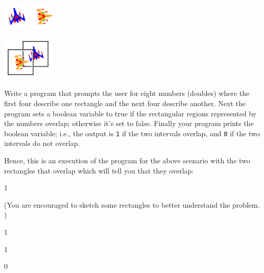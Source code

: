 \begin{center}
\includegraphics[width=0.5in]{figure3.png}
\includegraphics[width=0.5in]{figure4.png}
\end{center}

\begin{center}
\includegraphics[width=1in]{figure5.png}
\end{center}

Write a program that prompts the user for eight numbers (doubles) where the 
first four describe one rectangle and the next four describe another. Next the 
program sets a boolean variable to true if the rectangular regions represented 
by the numbers overlap; otherwise it's set to false. Finally your program 
prints the boolean variable; i.e., the output is \verb!1! if the two intervals 
overlap, and \verb!0! if the two intervals do not overlap.

Hence, this is an execution of the program for the above scenario with the two
rectangles that overlap which will tell you that they overlap:
\begin{console}[commandchars=\\\{\}]
1
\end{console}

(You are encouraged to sketch some rectangles to better understand the problem.
)

\resett
\nextt
\begin{console}[commandchars=\\\{\}]
1
\end{console}

\nextt
\begin{console}[commandchars=\\\{\}]
1
\end{console}

\nextt
\begin{console}[commandchars=\\\{\}]
0
\end{console}

